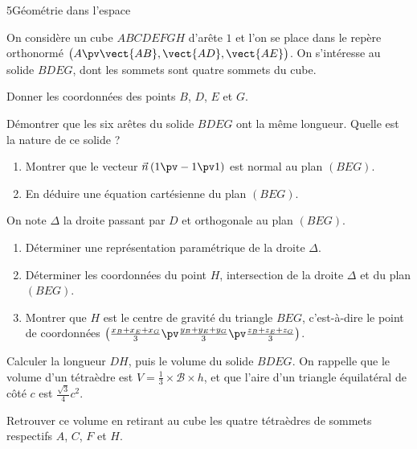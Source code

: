 \begin{exoBac}{5}{Géométrie dans l'espace}
\begin{codecote}[0.6]
On considère un cube $ABCDEFGH$ d'arête $1$ et l'on se place dans le repère orthonormé $\big(A\pv\vect{AB},\vect{AD},\vect{AE}\big)$.
On s'intéresse au solide $BDEG$, dont les sommets sont quatre sommets du cube.
\begin{questions}
  \item Donner les coordonnées des points $B$, $D$, $E$ et $G$.
  \item Démontrer que les six arêtes du solide $BDEG$ ont la même longueur. Quelle est la nature de ce solide ?
  \item \begin{enumerate}[label=\alph*),leftmargin=1.4em,itemsep=0.4mm,topsep=0.4mm]
      \item Montrer que le vecteur $\vec n\,(1\pv-1\pv1)$ est normal au plan $(BEG)$.
      \item En déduire une équation cartésienne du plan $(BEG)$.
    \end{enumerate}
\end{questions}
\cote
\centering
{}
\end{codecote}
\begin{questions}[start=4]
  \item On note $\Delta$ la droite passant par $D$ et orthogonale au plan $(BEG)$.
    \begin{enumerate}[label=\alph*),leftmargin=1.4em,itemsep=0.4mm,topsep=0.4mm]
      \item Déterminer une représentation paramétrique de la droite $\Delta$.
      \item Déterminer les coordonnées du point $H$, intersection de la droite $\Delta$ et du plan $(BEG)$.
      \item Montrer que $H$ est le centre de gravité du triangle $BEG$, c'est-à-dire le point de coordonnées
        $\left(\frac{x_B+x_E+x_G}{3}\pv\frac{y_B+y_E+y_G}{3}\pv\frac{z_B+z_E+z_G}{3}\right)$.
    \end{enumerate}
  \item Calculer la longueur $DH$, puis le volume du solide $BDEG$. On rappelle que le volume d'un tétraèdre est
    $V=\frac13\times\mathcal{B}\times h$, et que l'aire d'un triangle équilatéral de côté $c$ est $\frac{\sqrt3}{4}c^2$.
  \item Retrouver ce volume en retirant au cube les quatre tétraèdres de sommets respectifs $A$, $C$, $F$ et $H$.
\end{questions}
\end{exoBac}

